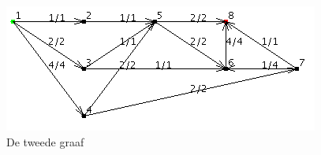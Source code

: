 \begin{figure}[h]
	\includegraphics[width=\linewidth]{priorityfirst/PFSgraph2}
	\centering
	\caption{De tweede graaf}
	\label{fig:PFSgraph2}
\end{figure}